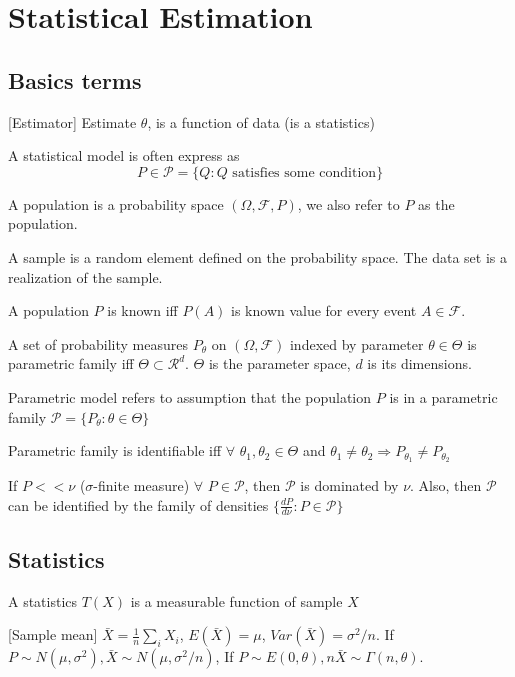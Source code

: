 \section{Statistical Estimation}

\subsection{Basics terms}

[Estimator] Estimate $\theta$, is a function of data (is a statistics)

 A statistical model is often express as 
$$
P\in\mathcal{P}=\{Q: Q \text{ satisfies some condition}\}
$$

A population is a probability space $(\Omega, \mathcal{F}, P)$, we also refer to $P$ as the population.

A sample is a random element defined on the probability space. The data set is a realization of the sample.

A population $P$ is known iff $P(A)$ is known value for every event $A\in \mathcal{F}$.

A set of probability measures $P_\theta$ on $(\Omega, \mathcal{F})$ indexed by parameter $\theta\in\Theta$ is parametric family iff $\Theta\subset\mathcal{R}^d$.
$\Theta$ is the parameter space, $d$ is its dimensions.

 Parametric model refers to assumption that the population $P$ is in a parametric family $\mathcal{P}=\{P_\theta:\theta\in\Theta\}$

\pline
[Identifiable] Parametric family is identifiable iff $\forall$ $\theta_1, \theta_2\in\Theta$ and $\theta_1\neq\theta_2\Rightarrow P_{\theta_1}\neq P_{\theta_2}$

\pline
[Dominated by] If $P << \nu$ ($\sigma$-finite measure) $\forall$ $P\in\mathcal{P}$, then $\mathcal{P}$ is dominated by $\nu$.
Also, then $\mathcal{P}$ can be identified by the family of densities $\{\frac{dP}{d\nu}: P\in\mathcal{P}\}$

\subsection{Statistics}

A statistics $T(X)$ is a measurable function of sample $X$

[Sample mean] $\bar{X}=\frac{1}{n}\sum_i X_i$,
$E(\bar{X})=\mu$, $Var(\bar{X})=\sigma^2/n$. If $P\sim N(\mu, \sigma^2), \bar{X}\sim N(\mu, \sigma^2/n)$, If $P\sim E(0, \theta), n\bar{X}\sim \Gamma(n, \theta)$.

